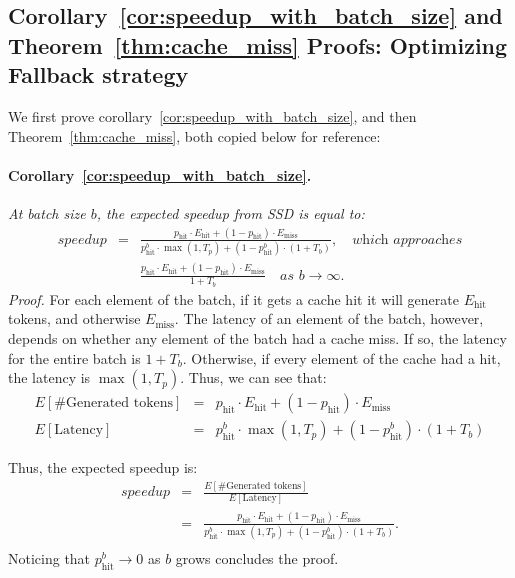 \subsection{Corollary~\ref{cor:speedup_with_batch_size} and
Theorem~\ref{thm:cache_miss} Proofs: Optimizing \Sys Fallback strategy}


We first prove corollary~\ref{cor:speedup_with_batch_size}, and then Theorem~\ref{thm:cache_miss}, both copied below for reference:

\paragraph{Corollary~\ref{cor:speedup_with_batch_size}.}
\label{cor:speedup_with_batch_size_app}
\textit{At batch size $b$, the expected speedup from SSD is equal to:}
\begin{eqnarray*}
speedup &=& \frac{p_{\mathrm{hit}} \cdot E_{\mathrm{hit}} + (1-p_{\mathrm{hit}}) \cdot E_{\mathrm{miss}}}{p_{\mathrm{hit}}^b \cdot \max(1, T_p) + (1-p_{\mathrm{hit}}^b) \cdot (1 + T_b)}, \quad \textit{which approaches} \\
    && \frac{p_{\mathrm{hit}} \cdot E_{\mathrm{hit}} + (1-p_{\mathrm{hit}}) \cdot E_{\mathrm{miss}}}{1 + T_b} \quad \textit{as } b \rightarrow \infty.
\end{eqnarray*}
\textit{Proof.}
For each element of the batch, if it gets a cache hit it will generate $E_{\mathrm{hit}}$ tokens, and otherwise $E_{\mathrm{miss}}$.
The latency of an element of the batch, however, depends on whether any element of the batch had a cache miss.
If so, the latency for the entire batch is $1 + T_b$.
Otherwise, if every element of the cache had a hit, the latency is $\max(1,T_p)$.
Thus, we can see that:
\begin{eqnarray*}
    E[\text{\# Generated tokens}] &=& p_{\mathrm{hit}} \cdot E_{\mathrm{hit}} + (1-p_{\mathrm{hit}}) \cdot E_{\mathrm{miss}} \\
    E[\text{Latency}] &=& p_{\mathrm{hit}}^b \cdot \max(1, T_p) + (1-p_{\mathrm{hit}}^b) \cdot (1 + T_b)
\end{eqnarray*}

Thus, the expected speedup is:
\begin{eqnarray*}
speedup &=&  \frac{E[\text{\# Generated tokens}]}{E[\text{Latency}]} \\
&=&\frac{p_{\mathrm{hit}} \cdot E_{\mathrm{hit}} + (1-p_{\mathrm{hit}}) \cdot E_{\mathrm{miss}}}{p_{\mathrm{hit}}^b \cdot \max(1, T_p) + (1-p_{\mathrm{hit}}^b) \cdot (1 + T_b)}. \\
\end{eqnarray*}
Noticing that $p_{\mathrm{hit}}^b \rightarrow 0$ as $b$ grows concludes the proof.

